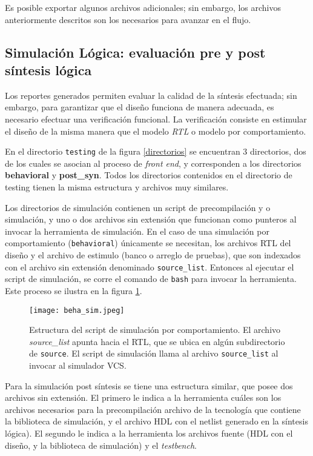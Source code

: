 Es posible exportar algunos archivos adicionales; sin embargo, los archivos anteriormente descritos son los necesarios para avanzar en el flujo.

\subsection{Simulación Lógica: evaluación pre y post síntesis lógica}
\label{sec:log_sim}
Los reportes generados permiten evaluar la calidad de la síntesis efectuada; sin embargo, para garantizar que el diseño funciona de manera adecuada, es necesario efectuar una verificación funcional. La verificación consiste en estimular el diseño de la misma manera que el modelo \textit{RTL} o modelo por comportamiento.

En el directorio \texttt{testing} de la figura \ref{directorios} se encuentran 3 directorios, dos de los cuales se asocian al proceso de \textit{front end}, y corresponden a los directorios \textbf{behavioral} y \textbf{post\_syn}. Todos los directorios contenidos en el directorio de testing tienen la misma estructura y archivos muy similares.

Los directorios de simulación contienen un script de precompilación y o simulación, y uno o dos archivos sin extensión que funcionan como punteros al invocar la herramienta de simulación. En el caso de una simulación por comportamiento (\texttt{behavioral}) únicamente se necesitan, los archivos RTL del diseño y el archivo de estimulo (banco o arreglo de pruebas), que son indexados con el archivo sin extensión denominado \texttt{source\_list}. Entonces al ejecutar el script de simulación, se corre el comando de \texttt{bash} para invocar la herramienta. Este proceso se ilustra en la figura \ref{beha_sim}.

\begin{figure}[h]
\texttt{[image: beha\_sim.jpeg]}
\centering
\caption{Estructura del script de simulación por comportamiento. El archivo \textit{source\_list} apunta hacia el RTL, que se ubica en algún subdirectorio de \texttt{source}. El script de simulación llama al archivo \texttt{source\_list} al invocar al simulador VCS.}
\label{beha_sim}
\end{figure}

Para la simulación post síntesis se tiene una estructura similar, que posee dos archivos sin extensión. El primero le indica a la herramienta cuáles son los archivos necesarios para la precompilación archivo de la tecnología que contiene la biblioteca de simulación, y el archivo HDL con el netlist generado en la síntesis lógica). El segundo le indica a la herramienta los archivos fuente (HDL con el diseño, y la biblioteca de simulación) y el \textit{testbench}.

